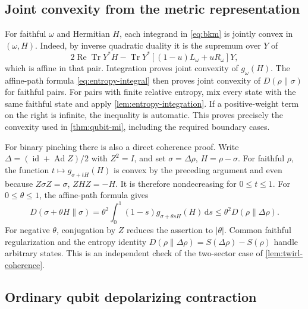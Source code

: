 \documentclass[11pt]{article}
\numberwithin{equation}{section}
\theoremstyle{definition}
\theoremstyle{remark}
\DeclareMathOperator{\Tr}{Tr}
\DeclareMathOperator{\id}{id}
\DeclareMathOperator{\Rea}{Re}
\DeclareMathOperator{\Ad}{Ad}
\newcommand{\dd}{\,\mathrm d}
\begin{document}
\subsection{Joint convexity from the metric representation}
\label{app:metric-convexity}

For faithful $\omega$ and Hermitian $H$, each integrand in
\eqref{eq:bkm} is jointly convex in $(\omega,H)$.
Indeed, by inverse quadratic duality it is the supremum over $Y$ of
\[
 2\Rea\Tr Y^*H-\Tr Y^*[(1-u)L_\omega+uR_\omega]Y,
\]
which is affine in that pair. Integration proves joint convexity of
$g_\omega(H)$. The affine-path formula
\eqref{eq:entropy-integral} then proves joint convexity of
$D(\rho\|\sigma)$ for faithful pairs. For pairs with finite relative
entropy, mix every state with the same faithful state and apply
\cref{lem:entropy-integration}. If a positive-weight term on the
right is infinite, the inequality is automatic.
This proves precisely the convexity used in
\cref{thm:qubit-mi}, including the required boundary cases.

For binary pinching there is also a direct coherence proof. Write
$\Delta=(\id+\Ad Z)/2$ with $Z^2=I$, and set
$\sigma=\Delta\rho$, $H=\rho-\sigma$.
For faithful $\rho$, the function
$t\mapsto g_{\sigma+tH}(H)$ is convex by the preceding argument and
even because $Z\sigma Z=\sigma$, $ZHZ=-H$.
It is therefore nondecreasing for $0\leq t\leq1$.
For $0\leq\theta\leq1$, the affine-path formula gives
\[
 D(\sigma+\theta H\|\sigma)
 =\theta^2\int_0^1(1-s)g_{\sigma+\theta sH}(H)\dd s
 \leq\theta^2D(\rho\|\Delta\rho).
\]
For negative $\theta$, conjugation by $Z$ reduces the assertion to
$|\theta|$. Common faithful regularization and the entropy identity
$D(\rho\|\Delta\rho)=S(\Delta\rho)-S(\rho)$ handle arbitrary states.
This is an independent check of the two-sector case of
\cref{lem:twirl-coherence}.

\subsection{Ordinary qubit depolarizing contraction}
\label{app:ordinary-qubit}
\end{document}
